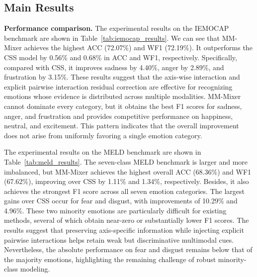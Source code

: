 \documentclass[letterpaper]{article} %
\begin{document}
\subsection{Main Results}
\noindent\textbf{Performance comparison.}
The experimental results on the IEMOCAP benchmark are shown in Table~\ref{tab:iemocap_results}. We can see that MM-Mixer achieves the highest ACC (72.07\%) and WF1 (72.19\%). It outperforms the CSS model by 0.56\% and 0.68\% in ACC and WF1, respectively. Specifically, compared with CSS, it improves sadness by 4.40\%, anger by 2.89\%, and frustration by 3.15\%. These results suggest that the axis-wise interaction and explicit pairwise interaction residual correction are effective for recognizing emotions whose evidence is distributed across multiple modalities. MM-Mixer cannot dominate every category, but it obtains the best F1 scores for sadness, anger, and frustration and provides competitive performance on happiness, neutral, and excitement. This pattern indicates that the overall improvement does not arise from uniformly favoring a single emotion category.


The experimental results on the MELD benchmark are shown in Table~\ref{tab:meld_results}. The seven-class MELD benchmark is larger and more imbalanced, but MM-Mixer achieves the highest overall ACC (68.36\%) and WF1 (67.62\%), improving over CSS by 1.11\% and 1.34\%, respectively. Besides, it also achieves the strongest F1 score across all seven emotion categories. The largest gains over CSS occur for fear and disgust, with improvements of 10.29\% and 4.96\%. These two minority emotions are particularly difficult for existing methods, several of which obtain near-zero or substantially lower F1 scores. The results
suggest that preserving axis-specific information while injecting explicit pairwise interactions helps retain weak but discriminative multimodal cues. Nevertheless, the absolute performance on fear and disgust remains below that of the majority emotions, highlighting the remaining challenge of robust minority-class modeling.
\end{document}
